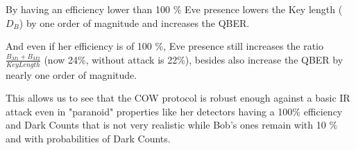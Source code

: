 \begin{refsection}
By having an efficiency lower than 100 \% Eve presence lowers the Key length ($D_B$) by one order of magnitude and increases the QBER.

And even if her efficiency is of 100 \%, Eve presence still increases the ratio $\frac{B_{M1}+B_{M2}}{Key Length}$ (now 24\%, without attack is 22\%), besides also increase the QBER by nearly one order of magnitude.

This allows us to see that the COW protocol is robust enough against a basic IR attack even in "paranoid" properties like her detectors having a 100\% efficiency and Dark Counts that is not very realistic while Bob's ones remain with 10 \% and with probabilities of Dark Counts.

\clearpage
\printbibliography[heading=subbibliography]
\end{refsection}
\cleardoublepage

